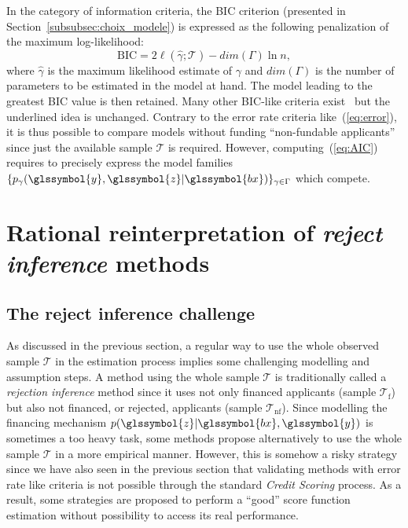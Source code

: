 In the category of information criteria, the BIC criterion (presented in Section~\ref{subsubsec:choix_modele}) is expressed as the following penalization of the maximum log-likelihood:
\begin{equation}\label{eq:AIC}
\mbox{BIC} = 2 \ell(\hat\gamma;\mathcal{T}) - dim(\Gamma) \ln n,
\end{equation}
where $\hat\gamma$ is the maximum likelihood estimate of $\gamma$ and $dim(\Gamma)$ is the number of parameters to be estimated in the model at hand. The model leading to the greatest BIC value is then retained. Many other BIC-like criteria exist~\cite{vandewalle:tel-00447141} but the underlined idea is unchanged. Contrary to the error rate criteria like~(\ref{eq:error}), it is thus possible to compare models without funding ``non-fundable applicants'' since just the available sample $\mathcal{T}$ is required. However, computing~(\ref{eq:AIC}) requires to precisely express the model families $\{p_{\gamma}(\glssymbol{y},\glssymbol{z}|\glssymbol{bx})\}_{\gamma \in \Gamma}$ which compete.

\section{Rational reinterpretation of \textit{reject inference} methods} \label{sec:methods_reject}

\subsection{The reject inference challenge} \label{subsec:challenge}

As discussed in the previous section, a regular way to use the whole observed sample $\mathcal{T}$ in the estimation process implies some challenging modelling and assumption steps. A method using the whole sample $\mathcal{T}$ is traditionally called a {\it rejection inference} method since it uses not only financed applicants (sample $\mathcal{T}_\text{f}$) but also not financed, or rejected, applicants (sample $\mathcal{T}_{\text{nf}}$).
Since modelling the financing mechanism $p(\glssymbol{z} | \glssymbol{bx}, \glssymbol{y})$ is sometimes a too heavy task, some methods propose alternatively to use the whole sample $\mathcal{T}$ in a more empirical manner. However, this is somehow a risky strategy since we have also seen in the previous section that validating methods with error rate like criteria is not possible through the standard \textit{Credit Scoring} process. As a result, some strategies are proposed to perform a ``good'' \gls{score} function estimation without possibility to access its real performance.

